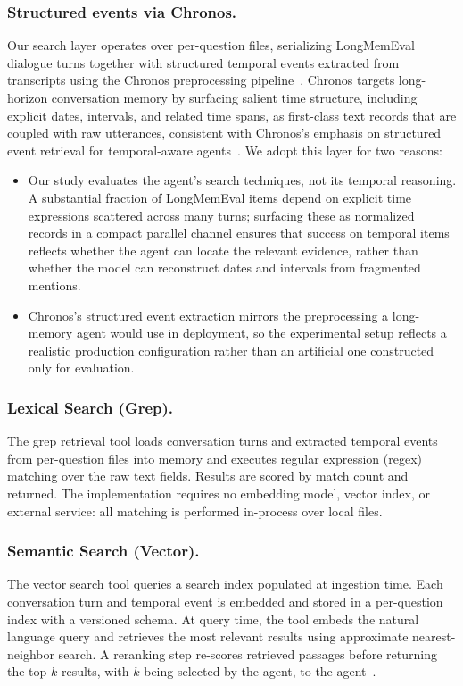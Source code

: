 \documentclass[sigconf,nonacm]{acmart}
\begin{document}
\subsubsection{Structured events via Chronos.}
Our search layer operates over per-question files, serializing LongMemEval dialogue turns together with structured temporal events extracted from transcripts using the Chronos preprocessing pipeline~\cite{chronos}. Chronos targets long-horizon conversation memory by surfacing salient time structure, including explicit dates, intervals, and related time spans, as first-class text records that are coupled with raw utterances, consistent with Chronos's emphasis on structured event retrieval for temporal-aware agents~\cite{chronos}. We adopt this layer for two reasons:
\begin{itemize}
    \item Our study evaluates the agent's search techniques, not its temporal reasoning. A substantial fraction of LongMemEval items depend on explicit time expressions scattered across many turns; surfacing these as normalized records in a compact parallel channel ensures that success on temporal items reflects whether the agent can locate the relevant evidence, rather than whether the model can reconstruct dates and intervals from fragmented mentions.
    \item Chronos's structured event extraction mirrors the preprocessing a long-memory agent would use in deployment, so the experimental setup reflects a realistic production configuration rather than an artificial one constructed only for evaluation.
\end{itemize}

\subsubsection{Lexical Search (Grep).}
The grep retrieval tool loads conversation turns and extracted temporal events from per-question files into memory and executes regular expression (regex) matching over the raw text fields. Results are scored by match count and returned. The implementation requires no embedding model, vector index, or external service: all matching is performed in-process over local files.

\subsubsection{Semantic Search (Vector).}
  The vector search tool queries a search index populated at ingestion time. Each conversation turn and temporal event is embedded and stored in a per-question index with a versioned schema. At query
  time, the tool embeds the natural language query and retrieves the most relevant results using approximate nearest-neighbor search. A reranking
  step re-scores retrieved passages before returning the top-$k$ results, with $k$ being selected by the agent, to the agent~\cite{gao2024ragsurvey}.
\end{document}
